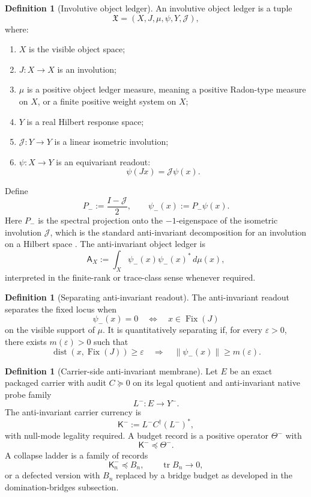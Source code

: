 \documentclass[11pt]{article}
\DeclareMathOperator{\tr}{tr}
\DeclareMathOperator{\dist}{dist}
\newcommand{\K}{\mathsf K}
\newcommand{\Fix}{\operatorname{Fix}}
\newcommand{\preceqq}{\preceq}
\theoremstyle{definition}
\newtheorem{definition}[theorem]{Definition}
\begin{document}
\begin{definition}[Involutive object ledger]\label{def:main:involutive-ledger}
An involutive object ledger is a tuple
\[
  \mathfrak X=(X,J,\mu,\psi,Y,\mathcal J),
\]
where:
\begin{enumerate}[label=(\roman*)]
\item \(X\) is the visible object space;
\item \(J:X\to X\) is an involution;
\item \(\mu\) is a positive object ledger measure, meaning a positive
  Radon-type measure on \(X\), or a finite positive weight system on
  \(X\);
\item \(Y\) is a real Hilbert response space;
\item \(\mathcal J:Y\to Y\) is a linear isometric involution;
\item \(\psi:X\to Y\) is an equivariant readout:
\[
  \psi(Jx)=\mathcal J\psi(x).
\]
\end{enumerate}
Define
\[
  P_-:=\frac{I-\mathcal J}{2},\qquad \psi_-(x):=P_-\psi(x).
\]
Here \(P_-\) is the spectral projection onto the \(-1\)-eigenspace
of the isometric involution \(\mathcal J\), which is the standard
anti-invariant decomposition for an involution on a Hilbert space
\citep{Conway1990FunctionalAnalysis}.
The anti-invariant object ledger is
\[
  \mathsf A_X:=\int_X \psi_-(x)\psi_-(x)^*\,d\mu(x),
\]
interpreted in the finite-rank or trace-class sense whenever required.
\end{definition}

\begin{definition}[Separating anti-invariant readout]\label{def:main:separating-readout}
The anti-invariant readout separates the fixed locus when
\[
  \psi_-(x)=0 \quad\Longleftrightarrow\quad x\in\Fix(J)
\]
on the visible support of \(\mu\).  It is quantitatively separating if,
for every \(\varepsilon>0\), there exists \(m(\varepsilon)>0\) such that
\[
  \dist(x,\Fix(J))\ge \varepsilon
  \quad\Longrightarrow\quad
  \|\psi_-(x)\|\ge m(\varepsilon).
\]
\end{definition}

\begin{definition}[Carrier-side anti-invariant membrane]\label{def:main:anti-invariant-membrane}
Let \(E\) be an exact packaged carrier with audit \(C\succeq 0\) on its
legal quotient and anti-invariant native probe family
\[
  L^-:E\to Y^-.
\]
The anti-invariant carrier currency is
\[
  \K^-:=L^-C^\dagger (L^-)^*,
\]
with null-mode legality required.  A budget record is a positive
operator \(\Theta^-\) with
\[
  \K^-\preceqq \Theta^-.
\]
A collapse ladder is a family of records
\[
  \K^-_n\preceqq B_n,\qquad \tr B_n\to 0,
\]
or a defected version with \(B_n\) replaced by a bridge budget as
developed in the domination-bridges subsection.
\end{definition}
\end{document}
